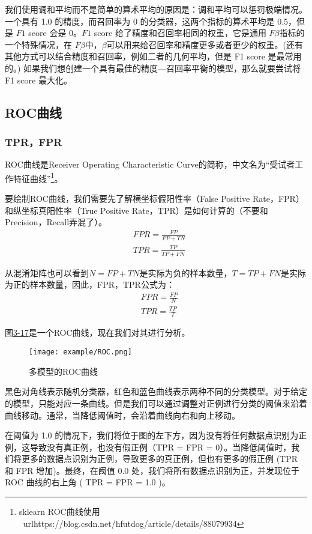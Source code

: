 我们使用调和平均而不是简单的算术平均的原因是：调和平均可以惩罚极端情况。一个具有 1.0 的精度，而召回率为 0 的分类器，这两个指标的算术平均是 0.5，但是 $F1$ score 会是 0。$F1$ score 给了精度和召回率相同的权重，它是通用 $F\beta$指标的一个特殊情况，在 $F\beta$中，$\beta$可以用来给召回率和精度更多或者更少的权重。(还有其他方式可以结合精度和召回率，例如二者的几何平均，但是 F1 score 是最常用的。) 如果我们想创建一个具有最佳的精度—召回率平衡的模型，那么就要尝试将 F1 score 最大化。

\subsection{ROC曲线}

\subsubsection{TPR，FPR}

ROC曲线是Receiver Operating Characteristic Curve的简称，中文名为“受试者工作特征曲线”\footnote{sklearn ROC曲线使用 \quad \ url{https://blog.csdn.net/hfutdog/article/details/88079934}}。

要绘制ROC曲线，我们需要先了解横坐标假阳性率（False Positive Rate，FPR）和纵坐标真阳性率（True Positive Rate，TPR）是如何计算的（不要和Precision，Recall弄混了）。
\begin{align}
& FPR = \frac{FP}{FP + TN} \\
& TPR = \frac{TP}{TP + FN}
\end{align}

从混淆矩阵也可以看到$N = FP+TN$是实际为负的样本数量，$T = TP+FN$是实际为正的样本数量，因此，FPR，TPR公式为：
\begin{align}
& FPR = \frac{FP}{N} \\
& TPR = \frac{TP}{T}
\end{align}

图\href{fig1:3-17}{3-17}是一个ROC曲线，现在我们对其进行分析。
\begin{figure}[!htp]
\centering
\texttt{[image: example/ROC.png]}
\caption{多模型的ROC曲线}
\label{fig1:3-15}
\end{figure}

黑色对角线表示随机分类器，红色和蓝色曲线表示两种不同的分类模型。对于给定的模型，只能对应一条曲线。但是我们可以通过调整对正例进行分类的阈值来沿着曲线移动。通常，当降低阈值时，会沿着曲线向右和向上移动。

在阈值为 1.0 的情况下，我们将位于图的左下方，因为没有将任何数据点识别为正例，这导致没有真正例，也没有假正例（TPR = FPR = 0）。当降低阈值时，我们将更多的数据点识别为正例，导致更多的真正例，但也有更多的假正例 (TPR 和 FPR 增加)。最终，在阈值 0.0 处，我们将所有数据点识别为正，并发现位于 ROC 曲线的右上角 ( TPR = FPR = 1.0 )。

